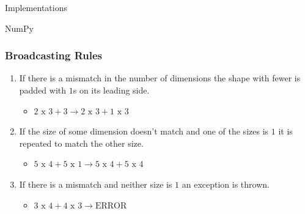 \documentclass{beamer}
\theoremstyle{case}
\begin{document}
\begin{section}{Implementations}
\begin{subsection}{NumPy}
\begin{frame}
    \frametitle{Broadcasting Rules}
    \begin{enumerate}
        \item If there is a mismatch in the number of dimensions the shape with fewer is padded with $1$s on its leading side.
            \begin{itemize}
                \item $2 \text{ x } 3 + 3 \rightarrow 2 \text{ x } 3 + 1 \text{ x } 3$
            \end{itemize}
        \item If the size of some dimension doesn't match and one of the sizes is $1$ it is repeated to match the other size.
            \begin{itemize}
                \item $5 \text{ x } 4 + 5 \text{ x } 1 \rightarrow 5 \text{ x } 4 + 5 \text{ x } 4$
            \end{itemize}
        \item If there is a mismatch and neither size is $1$ an exception is thrown.
            \begin{itemize}
                \item $3 \text{ x } 4 + 4 \text{ x } 3 \rightarrow \text{ERROR}$
            \end{itemize}
    \end{enumerate}
\end{frame}


\end{subsection}
\end{section}
\end{document}
